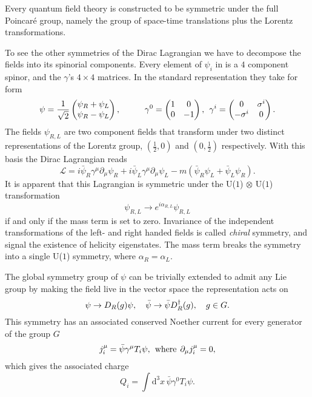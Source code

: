 Every quantum field theory is constructed to be symmetric under the full
Poincar\'{e} group, namely the group of space-time translations plus the Lorentz
transformations. 

To see the other symmetries of the Dirac Lagrangian we have to decompose the
fields into its spinorial components. Every element of $\psi_i$ in
 is a $4$ component spinor, and the $\gamma$'s $4 \times 4$
matrices. In the standard representation they take for form
%
\begin{equation}
  \psi = \frac{1}{\sqrt{2}} \begin{pmatrix} \psi_R + \psi_L \\ \psi_R - \psi_L \end{pmatrix}, \hskip1cm
    \gamma^0 = \begin{pmatrix} 1 & 0 \\ 0 & -1 \end{pmatrix}, \hskip1ex
    \gamma^i = \begin{pmatrix} 0 & \sigma^i \\ -\sigma^i & 0 \end{pmatrix}.
\end{equation}
%
The fields $\psi_{R,L}$ are two component fields that transform under two
distinct representations of the Lorentz group, $(\frac{1}{2}, 0)$ and $(0,
\frac{1}{2})$ respectively. With this basis the Dirac Lagrangian reads
%
\begin{equation}
  \mathcal{L} = i \bar{\psi}_R \gamma^{\mu}\partial_{\mu} \psi_R
    + i \bar{\psi}_L \gamma^{\mu}\partial_{\mu} \psi_L
    - m (\bar{\psi}_R\psi_L + \bar{\psi}_L\psi_R).
\end{equation}
%
It is apparent that this Lagrangian is symmetric under the U($1$) $\otimes$ U($1$)
transformation
%
\begin{equation}
  \psi_{R,L} \to e^{i \alpha_{R,L}} \psi_{R,L}
\end{equation}
%
if and only if the mass term is set to zero. Invariance of the independent
transformations of the left- and right handed fields is called \emph{chiral}
symmetry, and signal the existence of helicity eigenstates. The mass term breaks
the symmetry into a single U($1$) symmetry, where $\alpha_R = \alpha_L$.

The global symmetry group of $\psi$ can be trivially extended to admit any Lie
group by making the field live in the vector space the representation acts on 
%
\begin{equation} \label{eq:global_trafo}
  \psi \to D_R(g) \psi, \hskip1em \bar{\psi} \to \bar{\psi} D_R^{\dagger}(g),
  \hskip1em g \in G.
\end{equation}
%
This symmetry has an associated conserved Noether current for every generator of
the group $G$
%
\begin{equation}
  j^{\mu}_i = \bar{\psi} \gamma^{\mu} T_i \psi, \hskip1ex\text{where}\hskip1ex
    \partial_{\mu}j^{\mu}_i = 0,
\end{equation}
%
which gives the associated charge
%
\begin{equation}
  Q_i = \int \mathrm{d}^3 x\, \bar{\psi} \gamma^0 T_i \psi.
\end{equation}

